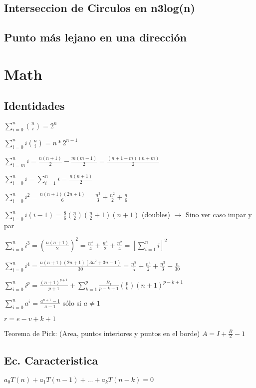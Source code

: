 \subsection{Interseccion de Circulos en n3log(n)}
\subsection{Punto más lejano en una dirección}

\section{Math}%
\subsection{Identidades}
{
$\sum_{i=0}^n\binom{n}{i}=2^n$

$\sum_{i=0}^n i\binom{n}{i}=n*2^{n-1}$

$\sum_{i=m}^n i = \frac{n(n+1)}{2} - \frac{m(m-1)}{2} = \frac{(n+1-m)(n+m)}{2}$

$\sum_{i=0}^n i = \sum_{i=1}^n i = \frac{n(n+1)}{2}$

$\sum_{i=0}^n i^2 = \frac{n(n+1)(2n+1)}{6} = \frac{n^3}{3} + \frac{n^2}{2} + \frac{n}{6}$

$\sum_{i=0}^n i(i-1) = \frac{8}{6}(\frac{n}{2})(\frac{n}{2}+1)(n+1)$ (doubles) $\rightarrow$ Sino ver caso impar y par

$\sum_{i=0}^n i^3 = \left(\frac{n(n+1)}{2}\right)^2 = \frac{n^4}{4} + \frac{n^3}{2} + \frac{n^2}{4} = \left[\sum_{i=1}^n i\right]^2$

$\sum_{i=0}^n i^4 = \frac{n(n+1)(2n+1)(3n^2+3n-1)}{30} = \frac{n^5}{5} + \frac{n^4}{2} + \frac{n^3}{3} - \frac{n}{30}$

$\sum_{i=0}^n i^p = \frac{(n+1)^{p+1}}{p+1} + \sum_{k=1}^p\frac{B_k}{p-k+1}{p\choose k}(n+1)^{p-k+1}$

$\sum_{i=0}^n a^i = \frac{a^{n+1}-1}{a-1}$ sólo si $a \neq 1$

$r=e-v+k+1$

Teorema de Pick: (Area, puntos interiores y puntos en el borde) $A=I+\frac{B}{2}-1$

}%

\subsection{Ec. Caracteristica}
$a_0T(n)+a_1T(n-1)+...+a_kT(n-k)=0$

